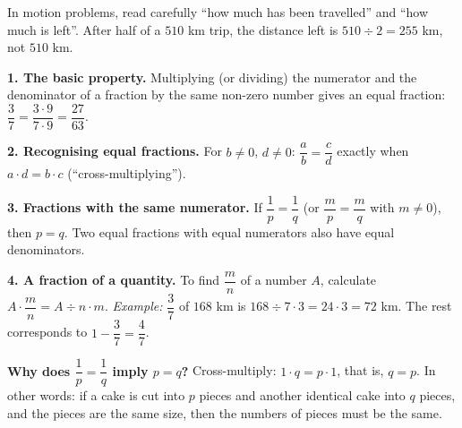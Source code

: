 \begin{warnbox}
In motion problems, read carefully ``how much has been travelled'' and ``how much is left''. After half of a $510$ km trip,
the distance left is $510\div 2=255$ km, not $510$ km.
\end{warnbox}

\begin{knowbox}
\textbf{1. The basic property.} Multiplying (or dividing) the numerator and the denominator of a fraction by the same non-zero number
gives an equal fraction: $\dfrac{3}{7}=\dfrac{3\cdot 9}{7\cdot 9}=\dfrac{27}{63}$.

\textbf{2. Recognising equal fractions.} For $b\neq 0$, $d\neq 0$:\quad
$\dfrac{a}{b}=\dfrac{c}{d}$ exactly when $a\cdot d=b\cdot c$ (``cross-multiplying'').

\textbf{3. Fractions with the same numerator.} If $\dfrac{1}{p}=\dfrac{1}{q}$ (or $\dfrac{m}{p}=\dfrac{m}{q}$ with $m\neq 0$), then $p=q$.
Two equal fractions with equal numerators also have equal denominators.

\textbf{4. A fraction of a quantity.} To find $\dfrac{m}{n}$ of a number $A$, calculate $A\cdot\dfrac{m}{n}=A\div n\cdot m$.
\emph{Example:} $\dfrac{3}{7}$ of $168$ km is $168\div 7\cdot 3=24\cdot 3=72$ km. The rest corresponds to $1-\dfrac{3}{7}=\dfrac{4}{7}$.
\end{knowbox}

\begin{proofbox}
\textbf{Why does $\dfrac{1}{p}=\dfrac{1}{q}$ imply $p=q$?} Cross-multiply: $1\cdot q=p\cdot 1$, that is, $q=p$.
In other words: if a cake is cut into $p$ pieces and another identical cake into $q$ pieces, and the pieces are the same size, then the numbers of pieces must be the same.
\end{proofbox}

